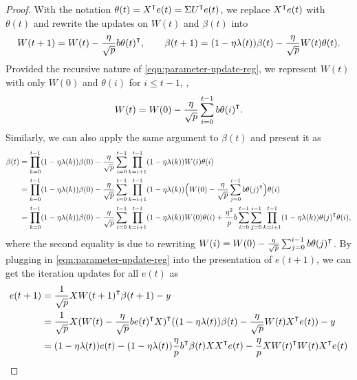 \begin{proof}
    With the notation $\theta(t) = X\transpose e(t) = \Sigma U\transpose e(t)$, we replace $X\transpose e(t)$ with $\theta(t)$ and rewrite the updates on $W(t)$ and $\beta(t)$ into 
    \begin{align}\label{eqn:parameter-update-reg}
        W(t+1) = W(t) - \frac{\eta}{\sqrt p}b \theta(t)\transpose, \qquad \beta(t+1) = (1-\eta\lambda(t))\beta(t) - \frac{\eta}{\sqrt p} W(t)\theta(t). 
    \end{align}
    Provided the recursive nature of \cref{eqn:parameter-update-reg}, we represent $W(t)$ with only $W(0)$ and $\theta(i)$ for $i\leq t-1$, \ie,
    \begin{align}\label{eqn:Wt}
        W(t) = W(0) - \frac{\eta}{\sqrt p} \sum_{i=0}^{t-1} b\theta(i)\transpose.
    \end{align}
    Similarly, we can also apply the same argument to $\beta(t)$ and present it as
    \begin{align}\label{eqn:betat}
        \beta(t) &= \prod_{k=0}^{t-1}(1-\eta\lambda(k))\beta(0) - \frac{\eta}{\sqrt p}\sum_{i=0}^{t-1} \prod_{k=i+1}^{t-1}(1-\eta\lambda(k))W(i)\theta(i) \\
        & = \prod_{k=0}^{t-1}(1-\eta\lambda(k))\beta(0) - \frac{\eta}{\sqrt p}\sum_{i=0}^{t-1} \prod_{k=i+1}^{t-1}(1-\eta\lambda(k))\Big( W(0) - \frac{\eta}{\sqrt p} \sum_{j=0}^{i-1} b\theta(j)\transpose\Big) \theta(i) \\
        & = \prod_{k=0}^{t-1}(1-\eta\lambda(k))\beta(0) - \frac{\eta}{\sqrt p}\sum_{i=0}^{t-1} \prod_{k=i+1}^{t-1}(1-\eta\lambda(k))W(0)\theta(i) + \frac{\eta^2}{p}b\sum_{i=0}^{t-1}\sum_{j=0}^{i-1} \prod_{k=i+1}^{t-1}(1-\eta\lambda(k))\theta(j)\transpose\theta(i),
    \end{align}
    where the second equality is due to rewriting $W(i) = W(0) - \frac{\eta}{\sqrt p} \sum_{j=0}^{i-1} b\theta(j)\transpose$. By plugging in \cref{eqn:parameter-update-reg} into the presentation of $e(t+1)$, we can get the iteration updates for all $e(t)$ as 
    \begin{align}\label{eqn:error-iterate}
        \begin{split}
            e(t+1) 
            &=\frac{1}{\sqrt p}X W(t+1)\transpose \beta(t+1) - y \\
            &=\frac{1}{\sqrt p}X (W(t) - \frac{\eta}{\sqrt p}b e(t)\transpose X)\transpose((1-\eta\lambda(t))\beta(t)-\frac{\eta}{\sqrt p} W(t)X\transpose e(t)) - y \\ 
            &=(1-\eta\lambda(t))e(t) - (1-\eta\lambda(t)) \frac{\eta}{p}b\transpose\beta(t) XX\transpose e(t) - \frac{\eta}{p}XW(t)\transpose W(t)X\transpose e(t) \\

\end{split}
\end{align}
\end{proof}
